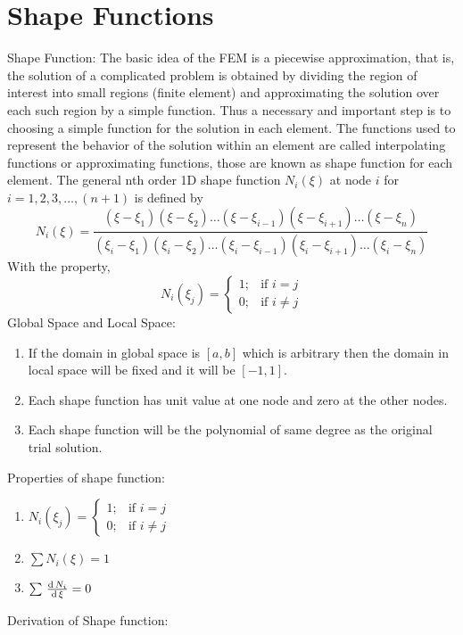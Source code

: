 \documentclass[../main-sheet.tex]{subfiles}
\begin{document}
\chapter{Shape Functions}

Shape Function:
The basic idea of the FEM is a piecewise approximation, that is, the solution of a complicated problem is obtained by dividing the region of interest into small regions (finite element) and approximating the solution over each such region by a simple function. Thus a necessary and important step is to choosing a simple function for the solution in each element. The functions used to represent the behavior of the solution within an element are called interpolating functions or approximating functions, those are known as shape function for each element.
The general nth order 1D shape function \(N_i(\xi )\) at node \(i\) for \(i = 1,2,3, \dots, (n + 1)\) is defined by
\[
N_i(\xi ) =	\frac{(\xi  - \xi_1)(\xi  - \xi_2) \dots (\xi  - \xi_{i-1})(\xi  - \xi_{i+1}) \dots (\xi  - \xi_n)}{(\xi_i - \xi_1)(\xi_i - \xi_2) \dots (\xi_i - \xi_{i-1})(\xi_i - \xi_{i+1}) \dots (\xi_i - \xi_n)}
\]
With the property,
\[
    N_i(\xi_j  ) = \begin{cases}
        1;&  \text{if }	i = j\\
        0;&  \text{if }	i \neq j
    \end{cases}  
\]
Global Space and Local Space:
\begin{enumerate}
    \item If the domain in global space is \([a, b]\) which is arbitrary then the domain in local space will be fixed and it will be \([-1, 1]\).
    \item Each shape function has unit value at one node and zero at the other nodes.
    \item Each shape function will be the polynomial of same degree as the original trial solution.
\end{enumerate}
Properties of shape function:
\begin{enumerate}
    \item \(N_i(\xi_j  ) = \begin{cases}
        1;&  \text{if }	i = j\\
        0;&  \text{if }	i \neq j
    \end{cases}\)
    \item \(\sum  N_i(\xi) = 1\)
    \item \(\sum  \,\frac{\mathrm{d}\,N_i}{\mathrm{d}\,\xi} = 0\)
\end{enumerate}
Derivation of Shape function:
\end{document}

